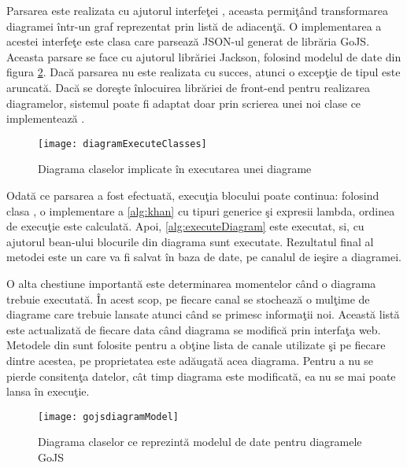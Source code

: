 Parsarea este realizata cu ajutorul interfeţei , aceasta permiţând transformarea diagramei într-un graf reprezentat prin listă de adiacenţă. O implementarea a acestei interfeţe este clasa  care parsează JSON-ul generat de librăria GoJS. Aceasta parsare se face cu ajutorul librăriei Jackson, folosind modelul de date din figura \cref{fig:gojsdiagramModel}. Dacă parsarea nu este realizata cu succes, atunci o excepţie de tipul  este aruncată.
Dacă se doreşte înlocuirea librăriei de front-end pentru realizarea diagramelor, sistemul poate fi adaptat doar prin scrierea unei noi clase ce implementează .

\begin{figure}[H]
	\centering
	\texttt{[image: diagramExecuteClasses]}
	\caption{Diagrama claselor implicate în executarea unei diagrame}
	\label{fig:diagramExecuteClasses}
\end{figure}
Odată ce parsarea a fost efectuată, execuţia blocului poate continua: folosind clasa , o implementare a \cref{alg:khan} cu tipuri generice şi expresii lambda, ordinea de execuţie este calculată. Apoi, \cref{alg:executeDiagram} este executat, si, cu ajutorul bean-ului  blocurile din diagrama sunt executate. Rezultatul final al metodei  este un  care va fi salvat în baza de date, pe canalul de ieşire a diagramei.

O alta chestiune importantă este determinarea momentelor când o diagrama trebuie executată. În acest scop, pe fiecare canal se stochează o mulţime de diagrame care trebuie lansate atunci când se primesc informaţii noi. Această listă este actualizată de fiecare data când diagrama se modifică prin interfaţa web. Metodele din  sunt folosite pentru a obţine lista de canale utilizate şi pe fiecare dintre acestea, pe proprietatea  este adăugată acea diagrama. Pentru a nu se pierde consitenţa datelor, cât timp diagrama este modificată, ea nu se mai poate lansa în execuţie.
\begin{figure}[H]
	\centering
	\texttt{[image: gojsdiagramModel]}
	\caption{Diagrama claselor ce reprezintă modelul de date pentru diagramele GoJS}
	\label{fig:gojsdiagramModel}
\end{figure}
